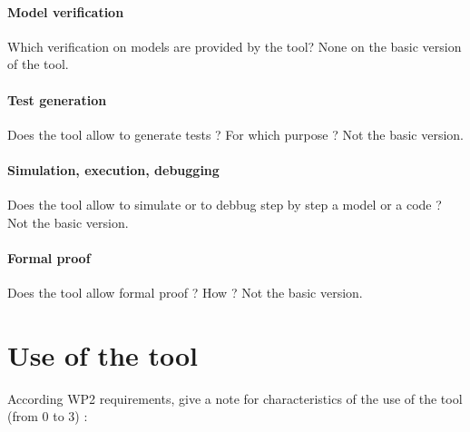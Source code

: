 \paragraph{Model verification}
Which verification on models are provided by the tool?
None on the basic version of the tool.
\paragraph{Test generation}
Does the tool allow to generate tests ? For  which purpose ?
Not the basic version.
\paragraph{Simulation, execution, debugging}
Does the tool allow to simulate or to debbug step by step a model or a code ?
Not the basic version.
\paragraph{Formal proof}
Does the tool allow formal proof ?  How ?
Not the basic version.


\section{Use of the tool}


According WP2 requirements, give a note for characteristics of the use of the tool (from 0 to 3) :

